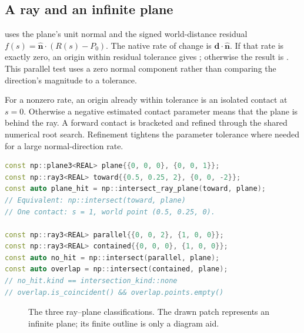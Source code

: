 \subsection{A ray and an infinite plane}

 uses the plane's unit normal and the signed
world-distance residual $f(s)=\widehat{\mathbf n}\mathbin{\cdot}(R(s)-P_0)$.
The native rate of change is $\mathbf d\mathbin{\cdot}\widehat{\mathbf n}$.
If that rate is exactly zero, an origin within residual tolerance gives
; otherwise the result is . This parallel test uses
a zero normal component rather than comparing the direction's magnitude to a
tolerance.

For a nonzero rate, an origin already within tolerance is an isolated contact
at $s=0$. Otherwise a negative estimated contact parameter means that the
plane is behind the ray. A forward contact is bracketed and refined through
the shared numerical root search. Refinement tightens the parameter tolerance
where needed for a large normal-direction rate.
\par\noindent\begin{minipage}{\linewidth}
\begin{lstlisting}[language=C++]
const np::plane3<REAL> plane{{0, 0, 0}, {0, 0, 1}};
const np::ray3<REAL> toward{{0.5, 0.25, 2}, {0, 0, -2}};
const auto plane_hit = np::intersect_ray_plane(toward, plane);
// Equivalent: np::intersect(toward, plane)
// One contact: s = 1, world point (0.5, 0.25, 0).

const np::ray3<REAL> parallel{{0, 0, 2}, {1, 0, 0}};
const np::ray3<REAL> contained{{0, 0, 0}, {1, 0, 0}};
const auto no_hit = np::intersect(parallel, plane);
const auto overlap = np::intersect(contained, plane);
// no_hit.kind == intersection_kind::none
// overlap.is_coincident() && overlap.points.empty()
\end{lstlisting}
\end{minipage}\par

\begin{figure}[htbp]
\centering
{}
\caption{The three ray--plane classifications. The drawn patch represents an
infinite plane; its finite outline is only a diagram aid.}
\label{fig:ray-plane-cases}
\end{figure}

